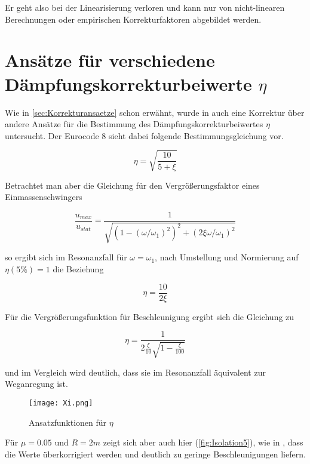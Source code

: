 Er geht also bei der Linearisierung verloren und kann nur von nicht-linearen Berechnungen oder empirischen Korrekturfaktoren abgebildet werden.

\pagebreak

\section{Ansätze für verschiedene Dämpfungskorrekturbeiwerte $\eta$}

Wie in \cref{sec:Korrekturansaetze} schon erwähnt, wurde in \cite{Isemann} auch eine Korrektur über andere Ansätze für die Bestimmung des Dämpfungskorrekturbeiwertes $\eta$ untersucht.
Der Eurocode 8 sieht dabei folgende Bestimmungsgleichung vor.

\begin{equation*}
\eta = \sqrt{\frac{10}{5+\xi}}
\end{equation*}

Betrachtet man aber die Gleichung für den Vergrößerungsfaktor eines Einmassenschwingers

\begin{equation}
\frac{u_{max}}{u_{stat}} = \frac{1}{\sqrt{(1 - (\omega / \omega_1)^2)^2 + (2 \xi \omega / \omega_1)^2}}
\end{equation}

so ergibt sich im Resonanzfall für $\omega = \omega_1$, nach Umstellung und Normierung auf $\eta(5 \%) = 1$ die Beziehung

\begin{equation}
\eta = \frac{10}{2\xi}
\end{equation}

\pagebreak

Für die Vergrößerungsfunktion für Beschleunigung ergibt sich die Gleichung zu 

\begin{equation}
\eta = \frac{1}{2\frac{\xi}{10}\sqrt{1-\frac{\xi}{100}}}
\end{equation}

und im Vergleich wird deutlich, dass sie im Resonanzfall äquivalent zur Weganregung ist.

\begin{figure}[H]
    \centering
    \texttt{[image: Xi.png]}
    \caption{Ansatzfunktionen für $\eta$}
    \label{fig:eta}
\end{figure}

Für $\mu = 0.05$ und $R = 2 m$ zeigt sich aber auch hier (\cref{fig:Isolation5}), wie in \cite{Isemann}, dass die Werte überkorrigiert werden und deutlich zu geringe Beschleunigungen liefern.

